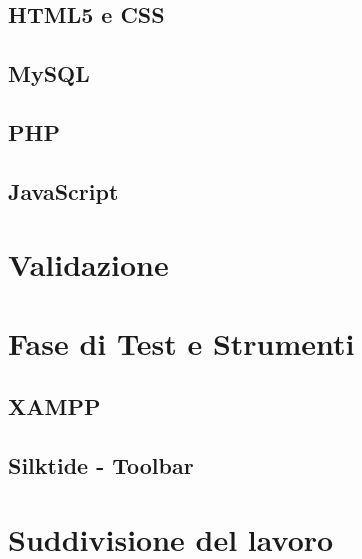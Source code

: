 \documentclass[a4paper, dvipsnames, table]{article}
\begin{document}
		\subsection{HTML5 e CSS}
		\subsection{MySQL}
			
		\subsection{PHP}
		\subsection{JavaScript}

\newpage
\section{Validazione}%

\newpage
\section{Fase di Test e Strumenti}%
	\subsection{XAMPP}
		
	\subsection*{Silktide - Toolbar}	
	
\newpage
\section{Suddivisione del lavoro}
\end{document}
